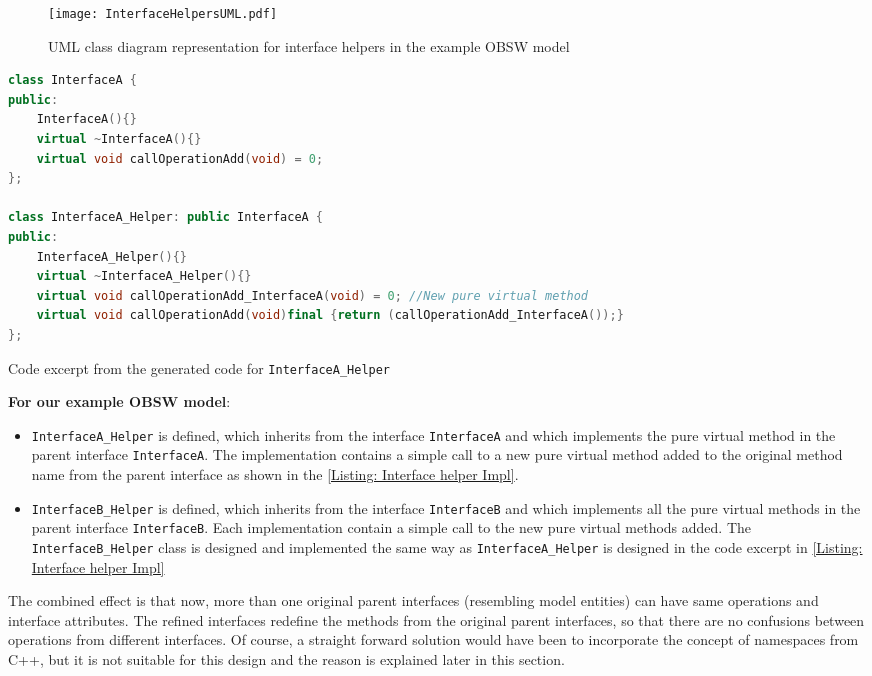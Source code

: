 \begin{figure}[h]
	\centering
	\texttt{[image: InterfaceHelpersUML.pdf]}
	\caption{UML class diagram representation for interface helpers in the example OBSW model}
	\label{fig: Interface helpers UML}
\end{figure}

\begin{Listing}
\begin{lstlisting}[language=C++]
class InterfaceA {
public:
	InterfaceA(){}
	virtual ~InterfaceA(){}
	virtual void callOperationAdd(void) = 0;
};

class InterfaceA_Helper: public InterfaceA {
public:
	InterfaceA_Helper(){}
	virtual ~InterfaceA_Helper(){}
	virtual void callOperationAdd_InterfaceA(void) = 0; //New pure virtual method
	virtual void callOperationAdd(void)final {return (callOperationAdd_InterfaceA());}
};
\end{lstlisting}
\caption{Code excerpt from the generated code for \texttt{InterfaceA\allowbreak\_Helper}}
\label{Listing: Interface helper Impl}
\end{Listing}

\textbf{For our example OBSW model}:
\begin{itemize}
\item \texttt{InterfaceA\allowbreak\_Helper} is defined, which inherits from the interface \texttt{InterfaceA} and which implements the pure virtual method in the parent interface \texttt{InterfaceA}. The implementation contains a simple call to a new pure virtual method added to the original method name from the parent interface as shown in the \cref{Listing: Interface helper Impl}.

\item \texttt{InterfaceB\allowbreak\_Helper} is defined, which inherits from the interface \texttt{InterfaceB} and which implements all the pure virtual methods in the parent interface \texttt{InterfaceB}. Each implementation contain a simple call to the new pure virtual methods added. The \texttt{InterfaceB\allowbreak\_Helper} class is designed and implemented the same way as \texttt{InterfaceA\allowbreak\_Helper} is designed in the code excerpt in \cref{Listing: Interface helper Impl}   
\end{itemize}

The combined effect is that now, more than one original parent interfaces (resembling model entities) can have same operations and interface attributes. The refined interfaces redefine the methods from the original parent interfaces, so that there are no confusions between operations from different interfaces. Of course, a straight forward solution would have been to incorporate the concept of namespaces from C++, but it is not suitable for this design and the reason is explained later in this section. 

